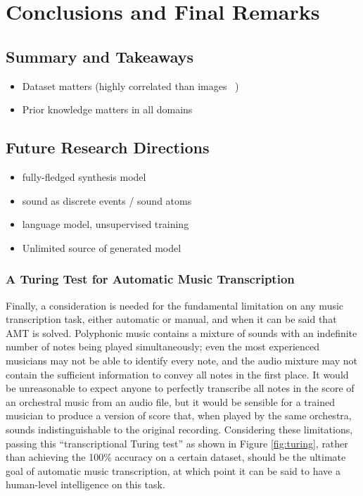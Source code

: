 
\graphicspath{{8-conclusions/figures/}}

\chapter{Conclusions and Final Remarks}
\label{ch:conclusions}

\section{Summary and Takeaways}

\begin{itemize}
	\item Dataset matters (highly correlated than images ~\cite{thickstun2018invariances})
	\item Prior knowledge matters in all domains
\end{itemize}


\section{Future Research Directions}

\begin{itemize}
	\item fully-fledged synthesis model
	\item sound as discrete events / sound atoms~\cite{leveau2008atoms}
	\item language model, unsupervised training \cite{huang2018transformer}
	\item Unlimited source of generated model
\end{itemize}


\subsection{A Turing Test for Automatic Music Transcription}

Finally, a consideration is needed for the fundamental limitation on any music transcription task, either automatic or manual, and when it can be said that AMT is solved.
Polyphonic music contains a mixture of sounds with an indefinite number of notes being played simultaneously; even the most experienced musicians may not be able to identify every note, and the audio mixture may not contain the sufficient information to convey all notes in the first place.
It would be unreasonable to expect anyone to perfectly transcribe all notes in the score of an orchestral music from an audio file, but it would be sensible for a trained musician to produce a version of score that, when played by the same orchestra, sounds indistinguishable to the original recording.
Considering these limitations, passing this ``transcriptional Turing test'' as shown in Figure \ref{fig:turing}, rather than achieving the 100\% accuracy on a certain dataset, should be the ultimate goal of automatic music transcription, at which point it can be said to have a human-level intelligence on this task.

